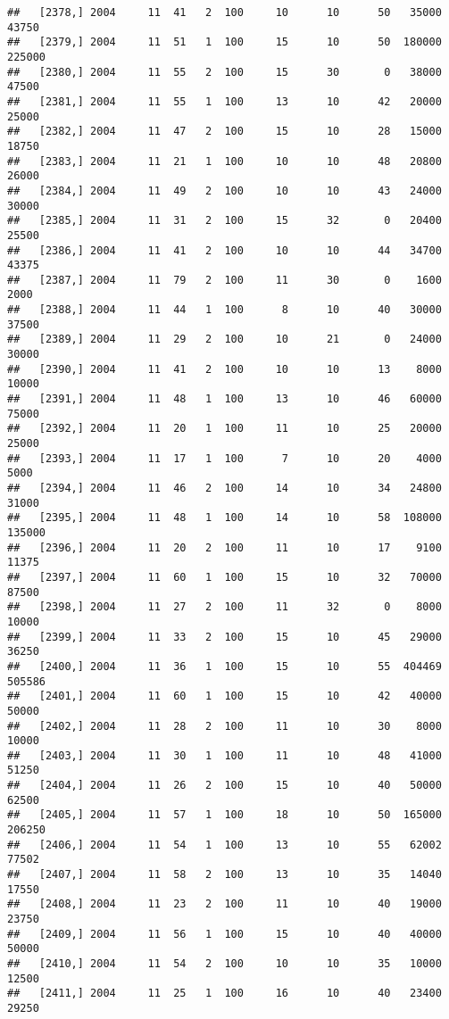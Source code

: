 \documentclass{article}\usepackage[]{graphicx}\usepackage[]{color}
\makeatletter
\newenvironment{kframe}{%
 \def\at@end@of@kframe{}%
 \ifinner\ifhmode%
  \def\at@end@of@kframe{\end{minipage}}%
  \begin{minipage}{\columnwidth}%
 \fi\fi%
 \def\FrameCommand##1{\hskip\@totalleftmargin \hskip-\fboxsep
 \colorbox{shadecolor}{##1}\hskip-\fboxsep
     \hskip-\linewidth \hskip-\@totalleftmargin \hskip\columnwidth}%
 \MakeFramed {\advance\hsize-\width
   \@totalleftmargin\z@ \linewidth\hsize
   \@setminipage}}%
 {\par\unskip\endMakeFramed%
 \at@end@of@kframe}
\newenvironment{knitrout}{}{} %
\makeatother
\begin{document}
\begin{knitrout}
\begin{kframe}
\begin{verbatim}
##   [2378,] 2004     11  41   2  100     10      10      50   35000   43750
##   [2379,] 2004     11  51   1  100     15      10      50  180000  225000
##   [2380,] 2004     11  55   2  100     15      30       0   38000   47500
##   [2381,] 2004     11  55   1  100     13      10      42   20000   25000
##   [2382,] 2004     11  47   2  100     15      10      28   15000   18750
##   [2383,] 2004     11  21   1  100     10      10      48   20800   26000
##   [2384,] 2004     11  49   2  100     10      10      43   24000   30000
##   [2385,] 2004     11  31   2  100     15      32       0   20400   25500
##   [2386,] 2004     11  41   2  100     10      10      44   34700   43375
##   [2387,] 2004     11  79   2  100     11      30       0    1600    2000
##   [2388,] 2004     11  44   1  100      8      10      40   30000   37500
##   [2389,] 2004     11  29   2  100     10      21       0   24000   30000
##   [2390,] 2004     11  41   2  100     10      10      13    8000   10000
##   [2391,] 2004     11  48   1  100     13      10      46   60000   75000
##   [2392,] 2004     11  20   1  100     11      10      25   20000   25000
##   [2393,] 2004     11  17   1  100      7      10      20    4000    5000
##   [2394,] 2004     11  46   2  100     14      10      34   24800   31000
##   [2395,] 2004     11  48   1  100     14      10      58  108000  135000
##   [2396,] 2004     11  20   2  100     11      10      17    9100   11375
##   [2397,] 2004     11  60   1  100     15      10      32   70000   87500
##   [2398,] 2004     11  27   2  100     11      32       0    8000   10000
##   [2399,] 2004     11  33   2  100     15      10      45   29000   36250
##   [2400,] 2004     11  36   1  100     15      10      55  404469  505586
##   [2401,] 2004     11  60   1  100     15      10      42   40000   50000
##   [2402,] 2004     11  28   2  100     11      10      30    8000   10000
##   [2403,] 2004     11  30   1  100     11      10      48   41000   51250
##   [2404,] 2004     11  26   2  100     15      10      40   50000   62500
##   [2405,] 2004     11  57   1  100     18      10      50  165000  206250
##   [2406,] 2004     11  54   1  100     13      10      55   62002   77502
##   [2407,] 2004     11  58   2  100     13      10      35   14040   17550
##   [2408,] 2004     11  23   2  100     11      10      40   19000   23750
##   [2409,] 2004     11  56   1  100     15      10      40   40000   50000
##   [2410,] 2004     11  54   2  100     10      10      35   10000   12500
##   [2411,] 2004     11  25   1  100     16      10      40   23400   29250

\end{verbatim}
\end{kframe}
\end{knitrout}
\end{document}
